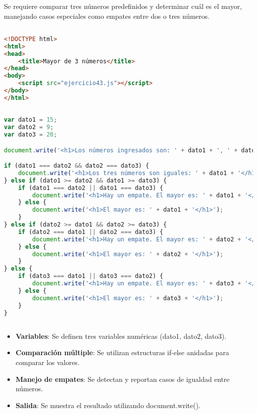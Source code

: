 \documentclass[10pt,a4paper]{article}
\begin{document}
\subsection{\color{colorESCOM}{Descripción del Problema}}
Se requiere comparar tres números predefinidos y determinar cuál es el mayor, manejando casos especiales como empates entre dos o tres números.

\subsection{\color{colorESCOM}{Código HTML}}
\begin{lstlisting}[language=HTML]
<!DOCTYPE html>
<html>
<head>
    <title>Mayor de 3 números</title>
</head>
<body>
    <script src="ejercicio43.js"></script>
</body>
</html>
\end{lstlisting}

\subsection{\color{colorESCOM}{Código JavaScript}}
\begin{lstlisting}[language=JavaScript]
var dato1 = 15;
var dato2 = 9;
var dato3 = 20;

document.write('<h1>Los números ingresados son: ' + dato1 + ', ' + dato2 + ' y ' + dato3 + '</h1>');

if (dato1 === dato2 && dato2 === dato3) {
    document.write('<h1>Los tres números son iguales: ' + dato1 + '</h1>');
} else if (dato1 >= dato2 && dato1 >= dato3) {
    if (dato1 === dato2 || dato1 === dato3) {
        document.write('<h1>Hay un empate. El mayor es: ' + dato1 + '</h1>');
    } else {
        document.write('<h1>El mayor es: ' + dato1 + '</h1>');
    }
} else if (dato2 >= dato1 && dato2 >= dato3) {
    if (dato2 === dato1 || dato2 === dato3) {
        document.write('<h1>Hay un empate. El mayor es: ' + dato2 + '</h1>');
    } else {
        document.write('<h1>El mayor es: ' + dato2 + '</h1>');
    }
} else {
    if (dato3 === dato1 || dato3 === dato2) {
        document.write('<h1>Hay un empate. El mayor es: ' + dato3 + '</h1>');
    } else {
        document.write('<h1>El mayor es: ' + dato3 + '</h1>');
    }
}
\end{lstlisting}

\subsection{\color{colorESCOM}{Análisis del Algoritmo}}
\begin{itemize}
	\item \textbf{Variables}: Se definen tres variables numéricas (dato1, dato2, dato3).
	\item \textbf{Comparación múltiple}: Se utilizan estructuras if-else anidadas para comparar los valores.
	\item \textbf{Manejo de empates}: Se detectan y reportan casos de igualdad entre números.
	\item \textbf{Salida}: Se muestra el resultado utilizando document.write().
\end{itemize}
\end{document}
